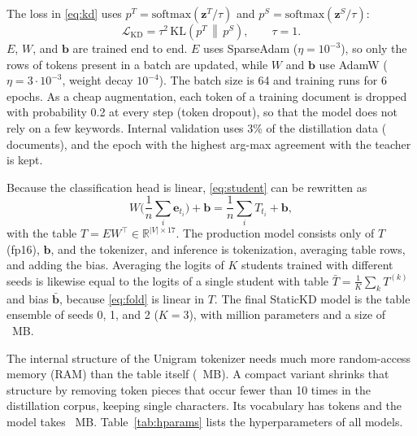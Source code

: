 The loss in \eqref{eq:kd} uses $p^{T}=\mathrm{softmax}(\mathbf{z}^{T}/\tau)$ and $p^{S}=\mathrm{softmax}(\mathbf{z}^{S}/\tau)$:
\begin{equation}
\mathcal{L}_{\mathrm{KD}}=\tau^{2}\,\mathrm{KL}\!\left(p^{T}\,\middle\|\,p^{S}\right),\qquad \tau=1 .
\label{eq:kd}
\end{equation}
$E$, $W$, and $\mathbf{b}$ are trained end to end. $E$ uses SparseAdam ($\eta=10^{-3}$), so only the rows of tokens present in a batch are updated, while $W$ and $\mathbf{b}$ use AdamW ($\eta=3\cdot 10^{-3}$, weight decay $10^{-4}$). The batch size is 64 and training runs for 6 epochs. As a cheap augmentation, each token of a training document is dropped with probability 0.2 at every step (token dropout), so that the model does not rely on a few keywords. Internal validation uses 3\% of the distillation data ( documents), and the epoch with the highest arg-max agreement with the teacher is kept.

Because the classification head is linear, \eqref{eq:student} can be rewritten as
\begin{equation}
W\Big(\frac{1}{n}\sum_{i}\mathbf{e}_{t_i}\Big)+\mathbf{b}=\frac{1}{n}\sum_{i}T_{t_i}+\mathbf{b},
\label{eq:fold}
\end{equation}
with the table $T=EW^{\top}\in\mathbb{R}^{|V|\times 17}$. The production model consists only of $T$ (fp16), $\mathbf{b}$, and the tokenizer, and inference is tokenization, averaging table rows, and adding the bias. Averaging the logits of $K$ students trained with different seeds is likewise equal to the logits of a single student with table $\bar{T}=\frac{1}{K}\sum_k T^{(k)}$ and bias $\bar{\mathbf{b}}$, because \eqref{eq:fold} is linear in $T$. The final StaticKD model is the table ensemble of seeds 0, 1, and 2 ($K=3$), with  million parameters and a size of ~MB.

The internal structure of the Unigram tokenizer needs much more random-access memory (RAM) than the table itself (~MB). A compact variant shrinks that structure by removing token pieces that occur fewer than 10 times in the distillation corpus, keeping single characters. Its vocabulary has  tokens and the model takes ~MB. Table~\ref{tab:hparams} lists the hyperparameters of all models.

\TabHparams

